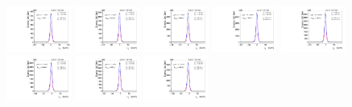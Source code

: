 \begin{figure}[htb]
\ContinuedFloat
\centering
\includegraphics[width=0.19\textwidth]{plots/Appendix_Recoil_Fits/WmmMC_PF_5TeV_2G/pfu1fit_0.pdf}
\includegraphics[width=0.19\textwidth]{plots/Appendix_Recoil_Fits/WmmMC_PF_5TeV_2G/pfu1fit_1.pdf}
\includegraphics[width=0.19\textwidth]{plots/Appendix_Recoil_Fits/WmmMC_PF_5TeV_2G/pfu1fit_2.pdf}
\includegraphics[width=0.19\textwidth]{plots/Appendix_Recoil_Fits/WmmMC_PF_5TeV_2G/pfu1fit_3.pdf}
\includegraphics[width=0.19\textwidth]{plots/Appendix_Recoil_Fits/WmmMC_PF_5TeV_2G/pfu1fit_4.pdf}
\includegraphics[width=0.19\textwidth]{plots/Appendix_Recoil_Fits/WmmMC_PF_5TeV_2G/pfu1fit_5.pdf}
\includegraphics[width=0.19\textwidth]{plots/Appendix_Recoil_Fits/WmmMC_PF_5TeV_2G/pfu1fit_6.pdf}
\includegraphics[width=0.19\textwidth]{plots/Appendix_Recoil_Fits/WmmMC_PF_5TeV_2G/pfu1fit_7.pdf}

\end{figure}
